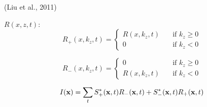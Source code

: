 \begin{frame}
  (Liu et al., 2011)

  $R(x,z,t)$:
  \[
    R_{+}(x,k_z,t) = 
    \begin{cases}
    R(x,k_z,t)      & \quad \text{if } k_z\geq0\\
    0               & \quad \text{if } k_z < 0
  \end{cases}
  \]

  \[
    R_{-}(x,k_z,t) = 
    \begin{cases}
    0               & \quad \text{if } k_z\geq0\\
    R(x,k_z,t)      & \quad \text{if } k_z < 0
  \end{cases}
  \]
\end{frame}


\begin{frame}
\[
  I({\bf x}) = \sum_t S^*_+ ({\bf x},t) R_- ({\bf x},t) + S^*_- ({\bf x},t) R_+ ({\bf x},t)
\]
\end{frame}


\begin{frame}
\end{frame}

\begin{frame}
\end{frame}

\begin{frame}
\end{frame}

\begin{frame}
\end{frame}



